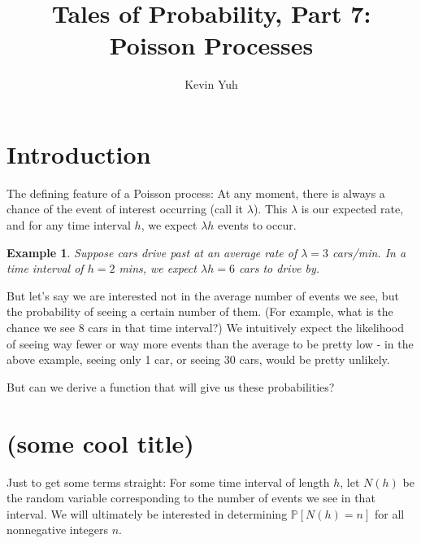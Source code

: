\documentclass{article}
\title{Tales of Probability, Part 7: Poisson Processes}
\author{Kevin Yuh}
\newtheorem{exmp}{Example}
\begin{document}
\maketitle


\section{Introduction}

The defining feature of a Poisson process: At any moment, there is always a chance of the event of interest occurring (call it $\lambda$). This $\lambda$ is our expected rate, and for any time interval $h$, we expect $\lambda h$ events to occur.

\begin{exmp}
Suppose cars drive past at an average rate of $\lambda = 3$ cars/min. In a time interval of $h = 2$ mins, we expect $\lambda h = 6$ cars to drive by. 
\end{exmp}

But let's say we are interested not in the average number of events we see, but the probability of seeing a certain number of them. (For example, what is the chance we see 8 cars in that time interval?) We intuitively expect the likelihood of seeing way fewer or way more events than the average to be pretty low - in the above example, seeing only 1 car, or seeing 30 cars, would be pretty unlikely. 

But can we derive a function that will give us these probabilities?



\section{(some cool title)}

Just to get some terms straight: For some time interval of length $h$, let $N(h)$ be the random variable corresponding to the number of events we see in that interval. We will ultimately be interested in determining $\mathbb{P}\left[N(h) = n\right]$ for all nonnegative integers $n$. 
\end{document}
